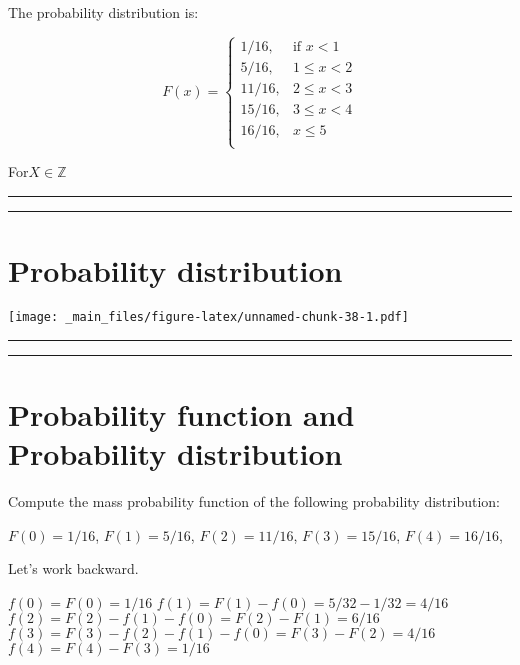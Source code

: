\documentclass[
]{book}
\begin{document}
The probability distribution is:

\[
    F(x)=
\begin{cases}
    1/16,& \text{if } x < 1\\
    5/16,& 1\leq x < 2\\
    11/16,& 2\leq x < 3\\
    15/16,& 3\leq x < 4\\
    16/16,&  x \leq 5\\
\end{cases}
\]

For\(X \in \mathbb{Z}\)

\begin{center}\rule{0.5\linewidth}{0.5pt}\end{center}

\begin{center}\rule{0.5\linewidth}{0.5pt}\end{center}

\hypertarget{probability-distribution-1}{%
\section{Probability distribution}\label{probability-distribution-1}}

\texttt{[image: \_main\_files/figure-latex/unnamed-chunk-38-1.pdf]}

\begin{center}\rule{0.5\linewidth}{0.5pt}\end{center}

\begin{center}\rule{0.5\linewidth}{0.5pt}\end{center}

\hypertarget{probability-function-and-probability-distribution}{%
\section{Probability function and Probability distribution}\label{probability-function-and-probability-distribution}}

Compute the mass probability function of the following probability distribution:

\(F(0)=1/16\), \(F(1)=5/16\), \(F(2)=11/16\), \(F(3)=15/16\), \(F(4)=16/16\),

Let's work backward.

\(f(0)=F(0)=1/16\)
\(f(1)=F(1)-f(0)=5/32-1/32=4/16\)
\(f(2)=F(2)-f(1)-f(0)=F(2)-F(1)=6/16\)
\(f(3)=F(3)-f(2)-f(1)-f(0)=F(3)-F(2)=4/16\)
\(f(4)=F(4)-F(3)=1/16\)
\end{document}
